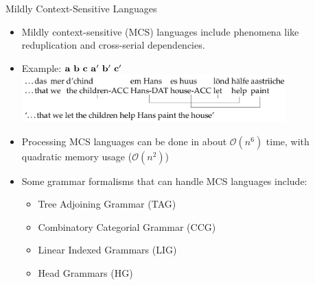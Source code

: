 \documentclass{beamer}
\newcommand{\detail}[1]{{\color{lightgrey}\small{}#1}}
\begin{document}
\begin{frame}{Mildly Context-Sensitive Languages}
\begin{block}{}
\begin{itemize}
	\item Mildly context-sensitive (MCS) languages include phenomena like reduplication and cross-serial dependencies.
	\item Example: $\bf a \ b \ c \ a^{\prime} \ b^{\prime} \ c^{\prime}$
	\pause
	\includegraphics[width=0.80\textwidth]{images/swiss_cross_serial_deps.png}
	\pause
	\item Processing MCS languages can be done in about $\mathcal{O}(n^6)$ time, with quadratic memory usage \detail{($\mathcal{O}(n^2)$)}
	\pause
	\item Some grammar formalisms that can handle MCS languages include:
	\begin{itemize}
		\item Tree Adjoining Grammar (TAG)
		\item Combinatory Categorial Grammar (CCG)
		\item Linear Indexed Grammars (LIG)
		\item Head Grammars (HG)
	\end{itemize}
\end{itemize}
\end{block}
\end{frame}
\end{document}
